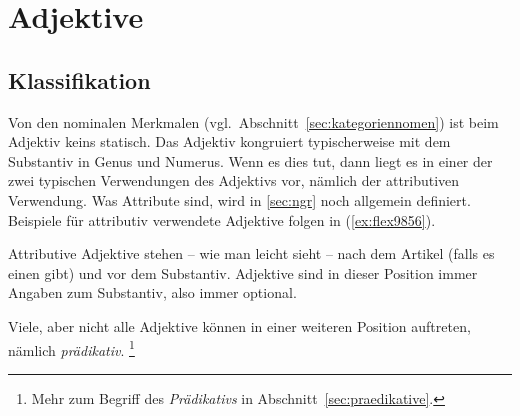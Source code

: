 \section{Adjektive}

\label{sec:adjektive}

\subsection{Klassifikation}

\label{sec:adjektivklassifikation}


Von den nominalen Merkmalen (vgl.\ Abschnitt~\ref{sec:kategoriennomen}) ist beim Adjektiv keins statisch.
Das Adjektiv kongruiert typischerweise mit dem Substantiv in Genus und Numerus.
Wenn es dies tut, dann liegt es in einer der zwei typischen Verwendungen des Adjektivs vor, nämlich der attributiven Verwendung.
Was Attribute sind, wird in \ref{sec:ngr} noch allgemein definiert.
Beispiele für attributiv verwendete Adjektive folgen in (\ref{ex:flex9856}).


\begin{exe}
  \ex \label{ex:flex9856}
  \begin{xlist}
  \end{xlist}
\end{exe}

Attributive Adjektive stehen -- wie man leicht sieht -- nach dem Artikel (falls es einen gibt) und vor dem Substantiv.
Adjektive sind in dieser Position immer Angaben zum Substantiv, also immer optional.

Viele, aber nicht alle Adjektive können in einer weiteren Position auftreten, nämlich \textit{prädikativ}.%
\footnote{Mehr zum Begriff des \textit{Prädikativs} in Abschnitt~\ref{sec:praedikative}.}

\begin{exe}
  \ex \label{ex:flex9857}
  \begin{xlist}
  \end{xlist}
\end{exe}



